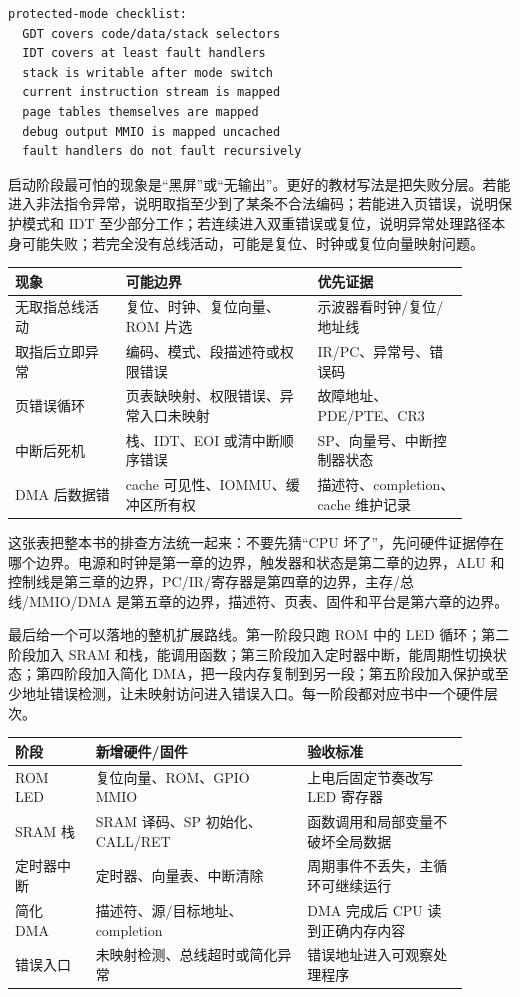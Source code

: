\begin{lstlisting}
protected-mode checklist:
  GDT covers code/data/stack selectors
  IDT covers at least fault handlers
  stack is writable after mode switch
  current instruction stream is mapped
  page tables themselves are mapped
  debug output MMIO is mapped uncached
  fault handlers do not fault recursively
\end{lstlisting}

启动阶段最可怕的现象是“黑屏”或“无输出”。更好的教材写法是把失败分层。若能进入非法指令异常，说明取指至少到了某条不合法编码；若能进入页错误，说明保护模式和 IDT 至少部分工作；若连续进入双重错误或复位，说明异常处理路径本身可能失败；若完全没有总线活动，可能是复位、时钟或复位向量映射问题。

\begin{longtable}{L{0.22\linewidth}L{0.38\linewidth}L{0.3\linewidth}}
\toprule
现象 & 可能边界 & 优先证据 \\
\midrule
无取指总线活动 & 复位、时钟、复位向量、ROM 片选 & 示波器看时钟/复位/地址线 \\
取指后立即异常 & 编码、模式、段描述符或权限错误 & IR/PC、异常号、错误码 \\
页错误循环 & 页表缺映射、权限错误、异常入口未映射 & 故障地址、PDE/PTE、CR3 \\
中断后死机 & 栈、IDT、EOI 或清中断顺序错误 & SP、向量号、中断控制器状态 \\
DMA 后数据错 & cache 可见性、IOMMU、缓冲区所有权 & 描述符、completion、cache 维护记录 \\
\bottomrule
\end{longtable}

这张表把整本书的排查方法统一起来：不要先猜“CPU 坏了”，先问硬件证据停在哪个边界。电源和时钟是第一章的边界，触发器和状态是第二章的边界，ALU 和控制线是第三章的边界，PC/IR/寄存器是第四章的边界，主存/总线/MMIO/DMA 是第五章的边界，描述符、页表、固件和平台是第六章的边界。

最后给一个可以落地的整机扩展路线。第一阶段只跑 ROM 中的 LED 循环；第二阶段加入 SRAM 和栈，能调用函数；第三阶段加入定时器中断，能周期性切换状态；第四阶段加入简化 DMA，把一段内存复制到另一段；第五阶段加入保护或至少地址错误检测，让未映射访问进入错误入口。每一阶段都对应书中一个硬件层次。

\begin{longtable}{L{0.16\linewidth}L{0.42\linewidth}L{0.32\linewidth}}
\toprule
阶段 & 新增硬件/固件 & 验收标准 \\
\midrule
ROM LED & 复位向量、ROM、GPIO MMIO & 上电后固定节奏改写 LED 寄存器 \\
SRAM 栈 & SRAM 译码、SP 初始化、CALL/RET & 函数调用和局部变量不破坏全局数据 \\
定时器中断 & 定时器、向量表、中断清除 & 周期事件不丢失，主循环可继续运行 \\
简化 DMA & 描述符、源/目标地址、completion & DMA 完成后 CPU 读到正确内存内容 \\
错误入口 & 未映射检测、总线超时或简化异常 & 错误地址进入可观察处理程序 \\
\bottomrule
\end{longtable}

